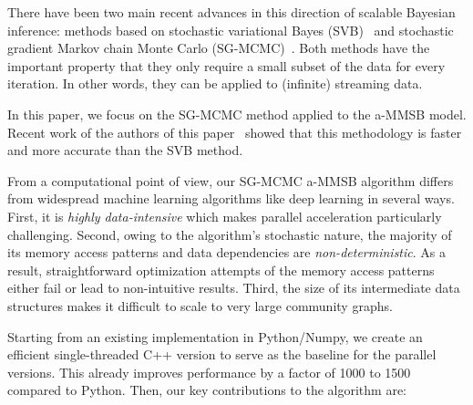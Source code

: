 There have been two main recent advances in this direction of scalable Bayesian inference: methods based on stochastic variational Bayes (SVB)~\cite{gopalan2012scalable,hoffman2013stochastic,gopalan2013efficient} and stochastic gradient Markov chain Monte Carlo (SG-MCMC)~\cite{welling2011bayesian,patterson2013stochastic,ahn2014distributed,ahn2012bayesian}. Both methods have the important property that they only require a small subset of the data for every iteration. In other words, they can be applied to (infinite) streaming data.

In this paper, we focus on the SG-MCMC method applied to the a-MMSB model. Recent
work of the authors of this paper~\cite{LiAW15} showed that this methodology is faster and more accurate than the
SVB method.

From a computational point of view, our SG-MCMC a-MMSB algorithm differs
from widespread machine learning algorithms like deep learning in several
ways. First, it is \emph{highly data-intensive} which makes parallel acceleration
particularly challenging. Second, owing to the algorithm's stochastic
nature, the majority of its memory access patterns and data dependencies
are \emph{non-deterministic}. As a result, straightforward optimization attempts
of the memory access patterns either fail or lead to non-intuitive results. Third,
the size of its intermediate data structures makes it difficult to scale to very large
community graphs.

Starting from an existing implementation in Python/Numpy, we create an efficient
single-threaded C++ version to serve as the baseline for the parallel versions.
This already improves performance by a factor of 1000 to 1500 compared to
Python.
Then, our key contributions to the algorithm are:

